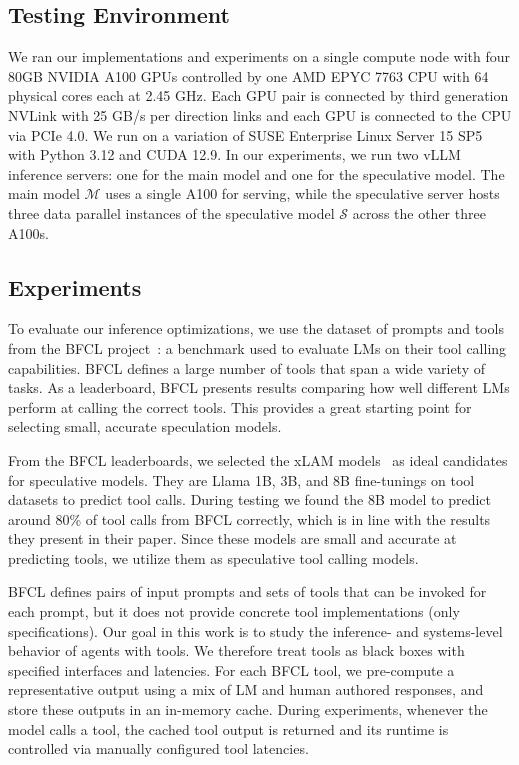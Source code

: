 \subsection{Testing Environment}\label{sec:test-env}

We ran our implementations and experiments on a single compute node with four 80GB NVIDIA A100 GPUs controlled by one AMD EPYC 7763 CPU with 64 physical cores each at 2.45 GHz.
Each GPU pair is connected by third generation NVLink with 25 GB/s per direction links and each GPU is connected to the CPU via PCIe 4.0.
We run on a variation of SUSE Enterprise Linux Server 15 SP5 with Python 3.12 and CUDA 12.9.
In our experiments, we run two vLLM inference servers: one for the main model and one for the speculative model. 
The main model $\mathcal{M}$ uses a single A100 for serving, while the speculative server hosts three data parallel instances of the speculative model $\mathcal{S}$ across the other three A100s.

\subsection{Experiments}\label{sec:experiments}

To evaluate our inference optimizations, we use the dataset of prompts and tools from the BFCL project~\cite{patil_gorilla_2023}: a benchmark used to evaluate LMs on their tool calling capabilities.
BFCL defines a large number of tools that span a wide variety of tasks.
As a leaderboard, BFCL presents results comparing how well different LMs perform at calling the correct tools.
This provides a great starting point for selecting small, accurate speculation models.

From the BFCL leaderboards, we selected the xLAM models~\cite{zhang_xlam_2024} as ideal candidates for speculative models.
They are Llama 1B, 3B, and 8B fine-tunings on tool datasets to predict tool calls.
During testing we found the 8B model to predict around 80\% of tool calls from BFCL correctly, which is in line with the results they present in their paper.
Since these models are small and accurate at predicting tools, we utilize them as speculative tool calling models.



BFCL defines pairs of input prompts and sets of tools that can be invoked for each prompt, but it does not provide concrete tool implementations (only specifications). Our goal in this work is to study the inference- and systems-level behavior of agents with tools.%
We therefore treat tools as black boxes with specified interfaces and latencies. For each BFCL tool, we pre-compute a representative output using a mix of LM and human authored responses, and store these outputs in an in-memory cache. During experiments, whenever the model calls a tool, the cached tool output is returned and its runtime is controlled via manually configured tool latencies.


